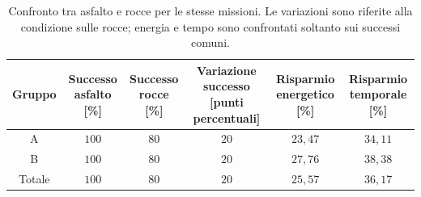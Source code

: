 \begin{table}[H]
\centering
\caption{Confronto tra asfalto e rocce per le stesse missioni. Le variazioni sono riferite alla condizione sulle rocce; energia e tempo sono confrontati soltanto sui successi comuni.}
\label{tab:exp1-1-confronto-rocks}
\small
\setlength{\tabcolsep}{4pt}
\begin{tabular}{@{}cccccc@{}}
\toprule
Gruppo & \shortstack{Successo\\asfalto [\%]} & \shortstack{Successo\\rocce [\%]} & \shortstack{Variazione successo\\{}[punti percentuali]} & \shortstack{Risparmio\\energetico [\%]} & \shortstack{Risparmio\\temporale [\%]} \\
\midrule
A & $100$ & $80$ & $20$ & $23{,}47$ & $34{,}11$ \\
B & $100$ & $80$ & $20$ & $27{,}76$ & $38{,}38$ \\
\midrule
Totale & $100$ & $80$ & $20$ & $25{,}57$ & $36{,}17$ \\
\bottomrule
\end{tabular}
\end{table}
